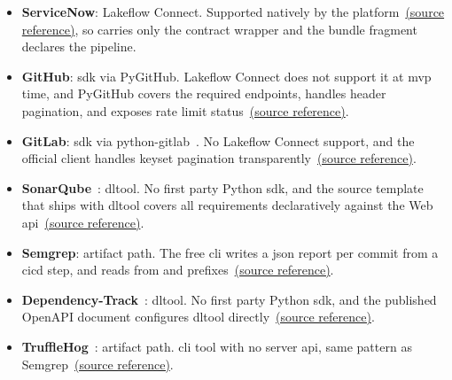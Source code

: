 \begin{itemize}
    \item \textbf{ServiceNow}: Lakeflow Connect. Supported natively by the platform~\href{https://vkraus.github.io/appsec-mvp/connectors/cmdb/servicenow/}{(source reference)}, so  carries only the contract wrapper and the bundle fragment declares the pipeline.

    \item \textbf{GitHub}: \gls{sdk} via PyGitHub. Lakeflow Connect does not support it at \gls{mvp} time, and PyGitHub covers the required endpoints, handles  header pagination, and exposes rate limit status~\href{https://vkraus.github.io/appsec-mvp/connectors/scm/github/}{(source reference)}.

    \item \textbf{GitLab}: \gls{sdk} via python-gitlab~\parencite{PythonGitlabDocs2025}. No Lakeflow Connect support, and the official client handles keyset pagination transparently~\href{https://vkraus.github.io/appsec-mvp/connectors/scm/gitlab/}{(source reference)}.

    \item \textbf{SonarQube}~\parencite{SonarQube2024}: \gls{dltool}. No first party Python \gls{sdk}, and the  source template that ships with \gls{dltool} covers all requirements declaratively against the Web \gls{api}~\href{https://vkraus.github.io/appsec-mvp/connectors/sast/sonarqube/}{(source reference)}.

    \item \textbf{Semgrep}: artifact path. The free \gls{cli} writes a \gls{json} report per commit from a \gls{cicd} step, and  reads from  and  prefixes~\href{https://vkraus.github.io/appsec-mvp/connectors/sast/semgrep/}{(source reference)}.

    \item \textbf{Dependency-Track}~\parencite{DependencyTrack2024}: \gls{dltool}. No first party Python \gls{sdk}, and the published OpenAPI document configures \gls{dltool} directly~\href{https://vkraus.github.io/appsec-mvp/connectors/sca/dependency-track/}{(source reference)}.

    \item \textbf{TruffleHog}~\parencite{TruffleHog2024}: artifact path. \Gls{cli} tool with no server \gls{api}, same pattern as Semgrep~\href{https://vkraus.github.io/appsec-mvp/connectors/secrets/trufflehog/}{(source reference)}.


\end{itemize}
